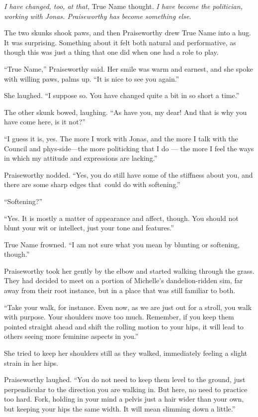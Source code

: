 \emph{I have changed, too, at that,} True Name thought. \emph{I have become the politician, working with Jonas. Praiseworthy has become something else.}

The two skunks shook paws, and then Praiseworthy drew True Name into a hug. It was surprising. Something about it felt both natural and performative, as though this was just a thing that one did when one had a role to play.

``True Name,'' Praiseworthy said. Her smile was warm and earnest, and she spoke with willing paws, palms up. ``It is nice to see you again.''

She laughed. ``I suppose so. You have changed quite a bit in so short a time.''

The other skunk bowed, laughing. ``As have you, my dear! And that is why you have come here, is it not?''

``I guess it is, yes. The more I work with Jonas, and the more I talk with the Council and phys-side---the more politicking that I do — the more I feel the ways in which my attitude and expressions are lacking.''

Praiseworthy nodded. ``Yes, you do still have some of the stiffness about you, and there are some sharp edges that\pagebreak\ could do with softening.''

``Softening?''

``Yes. It is mostly a matter of appearance and affect, though. You should not blunt your wit or intellect, just your tone and features.''

True Name frowned. ``I am not sure what you mean by blunting or softening, though.''

Praiseworthy took her gently by the elbow and started walking through the grass. They had decided to meet on a portion of Michelle's dandelion-ridden sim, far away from their root instance, but in a place that was still familiar to both.

``Take your walk, for instance. Even now, as we are just out for a stroll, you walk with purpose. Your shoulders move too much. Remember, if you keep them pointed straight ahead and shift the rolling motion to your hips, it will lead to others seeing more feminine aspects in you.''

She tried to keep her shoulders still as they walked, immediately feeling a slight strain in her hips.

Praiseworthy laughed. ``You do not need to keep them level to the ground, just perpendicular to the direction you are walking in. But here, no need to practice too hard. Fork, holding in your mind a pelvis just a hair wider than your own, but keeping your hips the same width. It will mean slimming down a little.''

